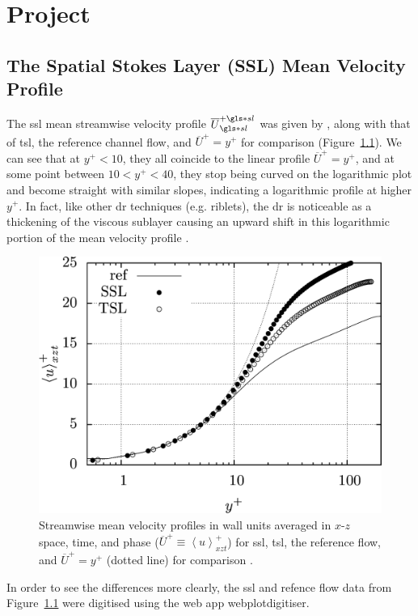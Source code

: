 \chapter{Project}\glsresetall
\section{The Spatial Stokes Layer (SSL) Mean Velocity Profile}\label{sec:sslmean}
The \gls{ssl} mean streamwise velocity profile $\overline{U}\ssl\ps$ was given by \vqt, along with that of \gls{tsl}, the reference channel flow, and $\overline{U}^{+}=y^{+}$ for comparison (Figure~\ref{fig:sslmeanprofile}). We can see that at $y^{+}<10$, they all coincide to the linear profile $\overline{U}^{+}=y^{+}$, and at some point between $10<y^{+}<40$, they stop being curved on the logarithmic plot and become straight with similar slopes, indicating a logarithmic profile at higher $y^{+}$. In fact, like other \gls{dr} techniques (e.g. riblets), the \gls{dr} is noticeable as a thickening of the viscous sublayer causing an upward shift in this logarithmic portion of the mean velocity profile \cite{viotti2009,choi1989,luchini1996}. 

\begin{figure}[htbp]
	\centering
	\includegraphics[width=0.5\linewidth]{project/fig/sslmeanprofile.png}
	\caption[Streamwise mean velocity profiles of SSL and reference flow]{Streamwise mean velocity profiles in wall units averaged in $x$-$z$ space, time, and phase ($\overline{U}^{+}\equiv \left<u \right>^{+}_{xzt}$) for \gls{ssl}, \gls{tsl}, the reference flow, and $\overline{U}^{+}=y^{+}$ (dotted line) for comparison \cite{viotti2009}.}
	\label{fig:sslmeanprofile}
\end{figure}

In order to see the differences more clearly, the  \gls{ssl} and refence flow data from Figure~\ref{fig:sslmeanprofile} were digitised using the web app webplotdigitiser. 

